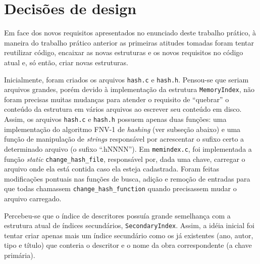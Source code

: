 \documentclass[a4paper,10pt]{article}
\begin{document}
\section{Decisões de design}
Em face dos novos requisitos apresentados no enunciado deste trabalho prático, à maneira do trabalho prático anterior as primeiras atitudes tomadas foram tentar reutilizar código, encaixar as novas estruturas e os novos requisitos no código atual e, só então, criar novas estruturas.

Inicialmente, foram criados os arquivos \texttt{hash.c} e \texttt{hash.h}. Pensou-se que seriam arquivos grandes, porém devido à implementação da estrutura \texttt{MemoryIndex}, não foram precisas muitas mudanças para atender o requisito de ``quebrar'' o conteúdo da estrutura em vários arquivos ao escrever seu conteúdo em disco. Assim, os arquivos \texttt{hash.c} e \texttt{hash.h} possuem apenas duas funções: uma implementação do algoritmo FNV-1 de \textit{hashing} (ver subseção abaixo) e uma função de manipulação de \textit{strings} responsável por acrescentar o sufixo certo a determinado arquivo (o sufixo ``.hNNNN''). Em \texttt{memindex.c}, foi implementada a função \textit{static} \texttt{change\_hash\_file}, responsável por, dada uma chave, carregar o arquivo onde ela está contida caso ela esteja cadastrada. Foram feitas modificações pontuais nas funções de busca, adição e remoção de entradas para que todas chamassem \texttt{change\_hash\_function} quando precisassem mudar o arquivo carregado.

Percebeu-se que o índice de descritores possuía grande semelhança com a estrutura atual de índices secundários, \texttt{SecondaryIndex}. Assim, a idéia inicial foi tentar criar apenas mais um índice secundário como os já existentes (ano, autor, tipo e título) que conteria o descritor e o nome da obra correspondente (a chave primária).
\end{document}
